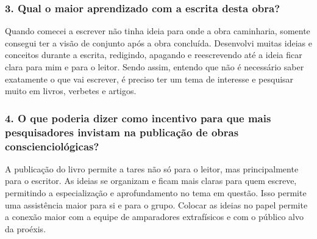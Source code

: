 \documentclass{gescons}
\begin{document}
\begin{multicols}{2}
\subsubsection{3. Qual o maior aprendizado com a escrita desta obra?}


Quando comecei a escrever não tinha ideia para onde a obra caminharia, somente consegui ter a visão de conjunto após a obra concluída. Desenvolvi muitas ideias e conceitos durante a escrita, redigindo, apagando e reescrevendo até a ideia ficar clara para mim e para o leitor. Sendo assim, entendo que não é necessário saber exatamente o que vai escrever, é preciso ter um tema de interesse e pesquisar muito em livros, verbetes e artigos.


\subsubsection{4. O que poderia dizer como incentivo para que mais pesquisadores invistam na publicação de obras conscienciológicas?}

A publicação do livro permite a tares não só para o leitor, mas principalmente para o escritor. As ideias se organizam e ficam mais claras para quem escreve, permitindo a especialização e aprofundamento no tema em questão. Isso permite uma assistência maior para si e para o grupo. Colocar as ideias no papel permite a conexão maior com a equipe de amparadores extrafísicos e com o público alvo da proéxis.
    
    \end{multicols}
\end{document}

